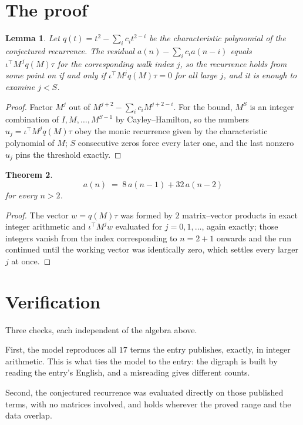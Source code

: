 \documentclass[11pt,a4paper]{article}
\theoremstyle{plain}
\newtheorem{theorem}{Theorem}
\newtheorem{lemma}[theorem]{Lemma}
\theoremstyle{definition}
\begin{document}
\section{The proof}

\begin{lemma}\label{lem:crit}
Let $q(t)=t^{2}-\sum_i c_it^{2-i}$ be the characteristic polynomial of the
conjectured recurrence. The residual $a(n)-\sum_ic_ia(n-i)$ equals
$\iota^{\!\top}M^{\,j}q(M)\tau$ for the corresponding walk index $j$, so the recurrence
holds from some point on if and only if $\iota^{\!\top}M^{j}q(M)\tau=0$ for all large $j$,
and it is enough to examine $j<S$.
\end{lemma}

\begin{proof}
Factor $M^{j}$ out of $M^{j+2}-\sum_ic_iM^{j+2-i}$. For the bound, $M^{S}$
is an integer combination of $I,M,\dots,M^{S-1}$ by Cayley--Hamilton, so the numbers
$u_j=\iota^{\!\top}M^{j}q(M)\tau$ obey the monic recurrence given by the characteristic
polynomial of $M$; $S$ consecutive zeros force every later one, and the last nonzero $u_j$
pins the threshold exactly.
\end{proof}

\begin{theorem}
\[
a(n)\;=\;8\,a(n-1) + 32\,a(n-2)
\]
for every $n>2$.
\end{theorem}

\begin{proof}
The vector $w=q(M)\tau$ was formed by $2$ matrix--vector products in exact integer
arithmetic and $\iota^{\!\top}M^{j}w$ evaluated for $j=0,1,\dots$, again exactly; those
integers vanish from the index corresponding to $n=2+1$ onwards and the run continued
until the working vector was identically zero, which settles every larger $j$ at once.
\end{proof}

\section{Verification}

Three checks, each independent of the algebra above.

First, the model reproduces all $17$ terms the entry publishes, exactly, in integer
arithmetic. This is what ties the model to the entry: the digraph is built by reading the
entry's English, and a misreading gives different counts.

Second, the conjectured recurrence was evaluated directly on those published terms, with no
matrices involved, and holds wherever the proved range and the data overlap.
\end{document}
